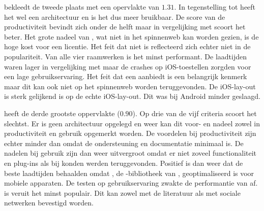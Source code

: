 \kendo{} bekleedt de tweede plaats met een opervlakte van $1.31$.
In tegenstelling tot \jqm{} heeft het wel een architectuur en is het dus meer bruikbaar.
De score van de productiviteit bevindt zich onder de helft maar in vergelijking met \st{} scoort het beter.
Het grote nadeel van \kendo{},  wat niet in het spinnenweb kan worden gezien,  is de hoge kost voor een licentie.
Het feit dat \kendo{} niet  is reflecteerd zich echter niet in de populariteit.
Van alle vier raamwerken is \kendo{} het minst performant.
De laadtijden waren lager in vergelijking met \st{} maar de crashes op iOS-toestellen zorgden voor een lage gebruikservaring.
Het feit dat \kendo{} een  aanbiedt is een belangrijk kenmerk maar dit kan ook niet op het spinnenweb worden teruggevonden.
De iOS-lay-out is sterk gelijkend is op de echte iOS-lay-out.
Dit was bij Android minder geslaagd.


\lungo{} heeft de derde grootste oppervlakte ($0.90$).
Op drie van de vijf criteria scoort \lungo{} het slechtst.
Er is geen architectuur opgelegd en weer kan dit voor- en nadeel zowel in productiviteit en gebruik opgemerkt worden.
De voordelen bij productiviteit zijn echter minder dan \jqm{} omdat de ondersteuning en documentatie minimaal is.
De nadelen bij gebruik zijn dan weer uitvergroot omdat er niet zoveel functionaliteit en plug-ins als bij \jqm{} konden werden teruggevonden.
Positief is dan weer dat \lungo{} de beste laadtijden behaalden omdat \quo{}, de \js{}-bibliotheek van \lungo{},  geoptimaliseerd is voor mobiele apparaten.
De testen op gebruikservaring zwakte de performantie van \lungo{} af.
\lungo{} is veruit het minst populair.
Dit kan zowel met de literatuur als met sociale netwerken bevestigd worden.


